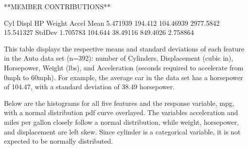 \documentclass{homework}
\begin{document}
\maketitle

**MEMBER CONTRIBUTIONS**

\question
\begin{rc}
           Cyl   Displ        HP    Weight     Accel
Mean   5.471939 194.412 104.46939 2977.5842 15.541327
StdDev 1.705783 104.644  38.49116  849.4026  2.758864
\end{rc}
This table displays the respective means and standard deviations of each feature in the Auto data set (n=392): number of Cylinders, Displacement (cubic in), Horsepower, Weight (lbs), and Acceleration (seconds required to accelerate from 0mph to 60mph). For example, the average car in the data set has a horsepower of 104.47, with a standard deviation of 38.49 horsepower.

\question
Below are the histograms for all five features and the response variable, mpg, with a normal distribution pdf curve overlayed. The variables acceleration and miles per gallon closely follow a normal distribution, while weight, horsepower, and displacement are left skew. Since cylinder is a categorical variable, it is not expected to be normally distributed.
\end{document}
